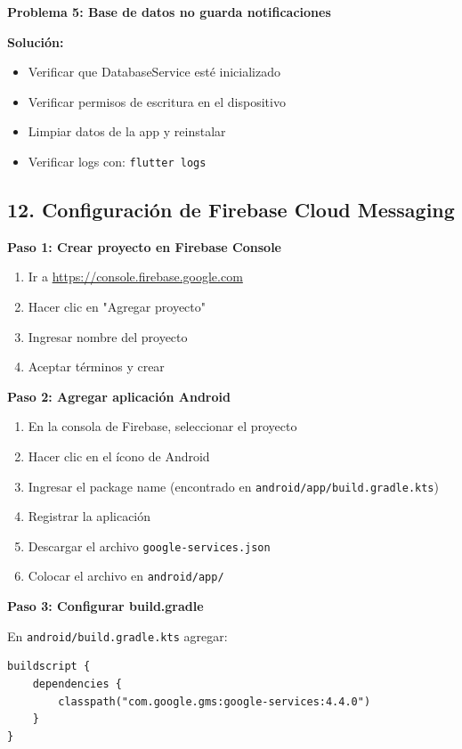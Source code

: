 \documentclass[12pt,a4paper]{article}
\begin{document}
\textbf{Problema 5: Base de datos no guarda notificaciones}

\textbf{Solución:}
\begin{itemize}
    \item Verificar que DatabaseService esté inicializado
    \item Verificar permisos de escritura en el dispositivo
    \item Limpiar datos de la app y reinstalar
    \item Verificar logs con: \texttt{flutter logs}
\end{itemize}

\newpage

\subsection*{12. Configuración de Firebase Cloud Messaging}

\textbf{Paso 1: Crear proyecto en Firebase Console}
\begin{enumerate}
    \item Ir a \url{https://console.firebase.google.com}
    \item Hacer clic en "Agregar proyecto"
    \item Ingresar nombre del proyecto
    \item Aceptar términos y crear
\end{enumerate}

\textbf{Paso 2: Agregar aplicación Android}
\begin{enumerate}
    \item En la consola de Firebase, seleccionar el proyecto
    \item Hacer clic en el ícono de Android
    \item Ingresar el package name (encontrado en \texttt{android/app/build.gradle.kts})
    \item Registrar la aplicación
    \item Descargar el archivo \texttt{google-services.json}
    \item Colocar el archivo en \texttt{android/app/}
\end{enumerate}

\textbf{Paso 3: Configurar build.gradle}

En \texttt{android/build.gradle.kts} agregar:
\begin{verbatim}
buildscript {
    dependencies {
        classpath("com.google.gms:google-services:4.4.0")
    }
}
\end{verbatim}
\end{document}

